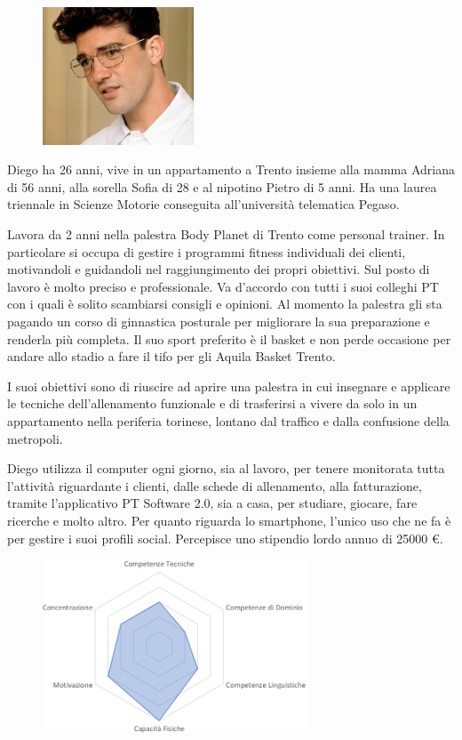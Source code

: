 \documentclass[12pt,italian,]{report}
\begin{document}
\begin{figure}[h]
\centering
\includegraphics[width=0.4\textwidth,height=\textheight]{img/diego.jpg}
\end{figure}


Diego ha 26 anni, vive in un appartamento a Trento insieme alla mamma
Adriana di 56 anni, alla sorella Sofia di 28 e al nipotino Pietro di 5
anni. Ha una laurea triennale in Scienze Motorie conseguita
all'università telematica Pegaso.

Lavora da 2 anni nella palestra Body Planet di Trento come personal
trainer. In particolare si occupa di gestire i programmi fitness
individuali dei clienti, motivandoli e guidandoli nel raggiungimento dei
propri obiettivi. Sul posto di lavoro è molto preciso e professionale.
Va d'accordo con tutti i suoi colleghi PT con i quali è solito
scambiarsi consigli e opinioni. Al momento la palestra gli sta pagando
un corso di ginnastica posturale per migliorare la sua preparazione e
renderla più completa. Il suo sport preferito è il basket e non perde
occasione per andare allo stadio a fare il tifo per gli Aquila Basket
Trento.

I suoi obiettivi sono di riuscire ad aprire una palestra in cui
insegnare e applicare le tecniche dell'allenamento funzionale e di
trasferirsi a vivere da solo in un appartamento nella periferia
torinese, lontano dal traffico e dalla confusione della metropoli.

Diego utilizza il computer ogni giorno, sia al lavoro, per tenere
monitorata tutta l'attività riguardante i clienti, dalle schede di
allenamento, alla fatturazione, tramite l'applicativo PT Software 2.0,
sia a casa, per studiare, giocare, fare ricerche e molto altro. Per
quanto riguarda lo smartphone, l'unico uso che ne fa è per gestire i
suoi profili social. Percepisce uno stipendio lordo annuo di 25000 €.

\begin{figure}[h]
\centering
\includegraphics[width=0.7\textwidth,height=\textheight]{img/diego_competenze.png}
\end{figure}
\end{document}
